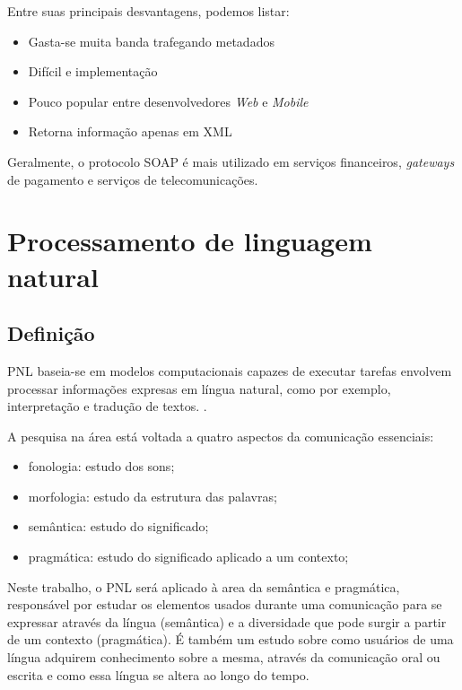 Entre suas principais desvantagens, podemos listar:

\begin{itemize}
	\item Gasta-se muita banda trafegando metadados
	\item Difícil e implementação
	\item Pouco popular entre desenvolvedores \textit{Web} e \textit{Mobile}
	\item Retorna informação apenas em XML
\end{itemize}

Geralmente, o protocolo SOAP é mais utilizado em serviços financeiros, \textit{gateways} de pagamento e serviços de telecomunicações.

\section{Processamento de linguagem natural}\label{sec:pnl}

\subsection{Definição}

\ac{PNL} baseia-se em modelos computacionais capazes de executar tarefas envolvem processar informações expresas em língua natural, como por exemplo, interpretação e tradução de textos. \cite{covington1994natural}.

A pesquisa na área está voltada a quatro aspectos da comunicação essenciais:

\begin{itemize}
	\item fonologia: estudo dos sons;
	\item morfologia: estudo da estrutura das palavras;
	\item semântica: estudo do significado;
	\item pragmática: estudo do significado aplicado a um contexto;
\end{itemize}

Neste trabalho, o PNL será aplicado à area da semântica e pragmática, responsável por estudar os elementos usados durante uma comunicação para se expressar através da língua (semântica) e a diversidade que pode surgir a partir de um contexto (pragmática). É também um estudo sobre como usuários de uma língua adquirem conhecimento sobre a mesma, através da comunicação oral ou escrita e como essa língua se altera ao longo do tempo.

